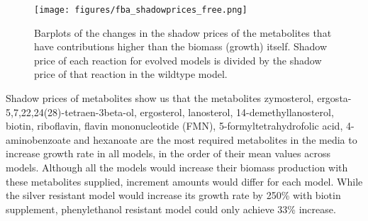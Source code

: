 \baselineskip


\begin{figure}[H]
  \begin{center}
  \texttt{[image: figures/fba\_shadowprices\_free.png]}
  \caption[Barplots of the changes in the shadow prices of the metabolites that have contributions higher than the biomass (growth) itself. Shadow price of each reaction for evolved models is divided by the shadow price of that reaction in the wildtype model]{Barplots of the changes in the shadow prices of the metabolites that have contributions higher than the biomass (growth) itself. Shadow price of each reaction for evolved models is divided by the shadow price of that reaction in the wildtype model.}
  \label{fig:fba_shadowprices_free}
  \end{center}
\end{figure}

Shadow prices of metabolites show us that the metabolites zymosterol, ergosta-5,7,22,24(28)-tetraen-3beta-ol, ergosterol, lanosterol, 14-demethyllanosterol, biotin, riboflavin, flavin mononucleotide (FMN), 5-formyltetrahydrofolic acid, 4-aminobenzoate and hexanoate are the most required metabolites in the media to increase growth rate in all models, in the order of their mean values across models. Although all the models would increase their biomass production with these metabolites supplied, increment amounts would differ for each model. While the silver resistant model would increase its growth rate by 250\% with biotin supplement, phenylethanol resistant model could only achieve 33\% increase.


